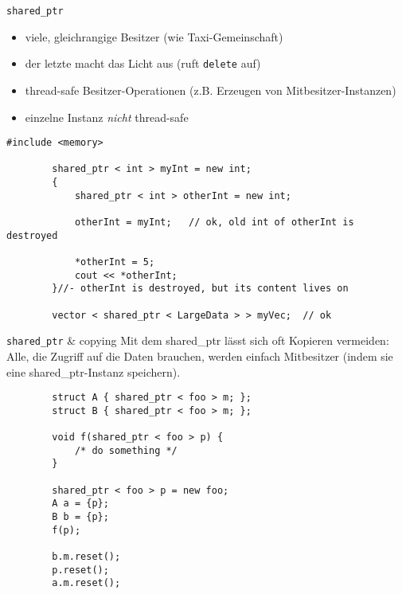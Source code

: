 \begin{frame}[fragile]{ \texttt{shared\_ptr} }
	\begin{itemize}
		\item viele, gleichrangige Besitzer (wie Taxi-Gemeinschaft)
		\item der letzte macht das Licht aus (ruft \texttt{delete} auf)
		\item thread-safe Besitzer-Operationen (z.B. Erzeugen von Mitbesitzer-Instanzen)
		\item einzelne Instanz \emph{nicht} thread-safe
	\end{itemize}
	
	\begin{lstlisting}[basicstyle=\scriptsize]
		#include <memory>
		
		shared_ptr < int > myInt = new int;
		{
		    shared_ptr < int > otherInt = new int;
			
		    otherInt = myInt;	// ok, old int of otherInt is destroyed
			
		    *otherInt = 5;
		    cout << *otherInt;
		}//- otherInt is destroyed, but its content lives on
		
		vector < shared_ptr < LargeData > > myVec;	// ok
	\end{lstlisting}
\end{frame}

\begin{frame}[fragile]{ \texttt{shared\_ptr} \& copying }
	Mit dem shared\_ptr lässt sich oft Kopieren vermeiden:\\
	Alle, die Zugriff auf die Daten brauchen, werden einfach Mitbesitzer (indem sie eine shared\_ptr-Instanz speichern).
	
	\begin{lstlisting}
		struct A { shared_ptr < foo > m; };
		struct B { shared_ptr < foo > m; };
		
		void f(shared_ptr < foo > p) {
		    /* do something */
		}
		
		shared_ptr < foo > p = new foo;
		A a = {p};
		B b = {p};
		f(p);
		
		b.m.reset();
		p.reset();
		a.m.reset();
	\end{lstlisting}
\end{frame}

